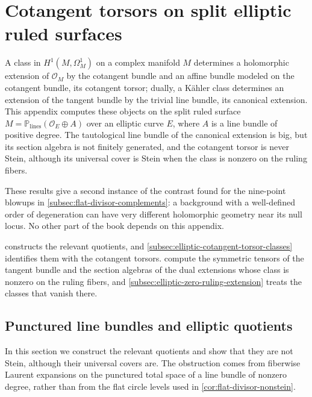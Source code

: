 \chapter{Cotangent torsors on split elliptic ruled surfaces}
\label{app:cotangent-torsors}
\begingroup
{}

A class in $H^1(M,\Omega^1_M)$ on a complex manifold $M$ determines a holomorphic extension of $\mathcal O_M$ by the cotangent bundle and an affine bundle modeled on the cotangent bundle, its cotangent torsor; dually, a K\"ahler class determines an extension of the tangent bundle by the trivial line bundle, its canonical extension. This appendix computes these objects on the split ruled surface $M=\mathbb P_{\mathrm{lines}}(\mathcal O_E\oplus A)$ over an elliptic curve $E$, where $A$ is a line bundle of positive degree. The tautological line bundle of the canonical extension is big, but its section algebra is not finitely generated, and the cotangent torsor is never Stein, although its universal cover is Stein when the class is nonzero on the ruling fibers.

These results give a second instance of the contrast found for the nine-point blowups in \cref{subsec:flat-divisor-complements}: a background with a well-defined order of degeneration can have very different holomorphic geometry near its null locus. No other part of the book depends on this appendix.

 constructs the relevant quotients, and \cref{subsec:elliptic-cotangent-torsor-classes} identifies them with the cotangent torsors.  compute the symmetric tensors of the tangent bundle and the section algebras of the dual extensions whose class is nonzero on the ruling fibers, and \cref{subsec:elliptic-zero-ruling-extension} treats the classes that vanish there.

\section{Punctured line bundles and elliptic quotients}
\label{subsec:elliptic-affine-quotients}

In this section we construct the relevant quotients and show that they are not Stein, although their universal covers are. The obstruction comes from fiberwise Laurent expansions on the punctured total space of a line bundle of nonzero degree, rather than from the flat circle levels used in \cref{cor:flat-divisor-nonstein}.

